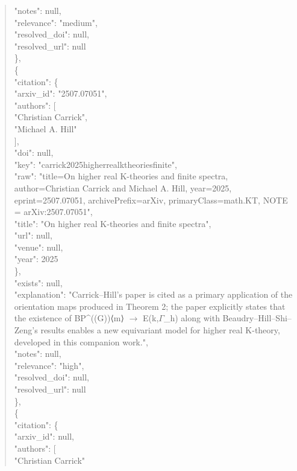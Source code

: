 \documentclass[11pt]{article}
\begin{document}
\begin{quote}
      "notes": null,\\
      "relevance": "medium",\\
      "resolved\_doi": null,\\
      "resolved\_url": null\\
    \},\\
    \{\\
      "citation": \{\\
        "arxiv\_id": "2507.07051",\\
        "authors": [\\
          "Christian Carrick",\\
          "Michael A. Hill"\\
        ],\\
        "doi": null,\\
        "key": "carrick2025higherrealktheoriesfinite",\\
        "raw": "title=On higher real K-theories and finite spectra, author=Christian Carrick and Michael A. Hill, year=2025, eprint=2507.07051, archivePrefix=arXiv, primaryClass=math.KT, NOTE = arXiv:2507.07051",\\
        "title": "On higher real K-theories and finite spectra",\\
        "url": null,\\
        "venue": null,\\
        "year": 2025\\
      \},\\
      "exists": null,\\
      "explanation": "Carrick--Hill's paper is cited as a primary application of the orientation maps produced in Theorem 2; the paper explicitly states that the existence of BP\^{}((G))⟨m⟩ \ensuremath{\to} E(k,\ensuremath{\Gamma}\_h) along with Beaudry--Hill--Shi--Zeng's results enables a new equivariant model for higher real K-theory, developed in this companion work.",\\
      "notes": null,\\
      "relevance": "high",\\
      "resolved\_doi": null,\\
      "resolved\_url": null\\
    \},\\
    \{\\
      "citation": \{\\
        "arxiv\_id": null,\\
        "authors": [\\
          "Christian Carrick"\\

\end{quote}
\end{document}
